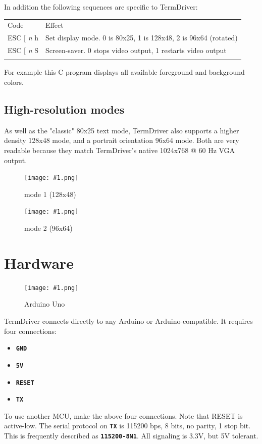 \documentclass{article}
\newcommand{\heavyline}{\specialrule{1pt}{1pt}{1pt}}
\newcommand{\png}[2]{
\begin{figure}[H]
\begin{center}
\texttt{[image: \#1.png]}
\caption{#2}
\end{center}
\end{figure}
}
\newcommand{\mach}[1]{\texttt{\textbf{#1}}}
\newcommand{\gap}{\vspace{10pt}}
\begin{document}
In addition the following sequences are specific to TermDriver:

\gap
\noindent
\begin{tabularx}{\linewidth}{lX}
\heavyline
Code & Effect \\ \heavyline

ESC {[} \emph{n} h & 
Set display mode.  0 is 80x25, 1 is 128x48, 2 is 96x64 (rotated)
\\

ESC {[} \emph{n} S & Screen-saver.  0 stops video output, 1 restarts video output
\\ \heavyline
\end{tabularx}
\gap

\noindent
For example this C program displays all available foreground and background colors.


\subsection{High-resolution modes}

As well as the "classic" 80x25 text mode,
TermDriver also supports a higher density 128x48 mode,
and a portrait orientation 96x64 mode.
Both are very readable because
they match TermDriver's native 1024x768 @ 60 Hz VGA output.

\png{img/moby1}{mode 1 (128x48)}
\png{img/moby2}{mode 2 (96x64)}

\newpage
\section{Hardware}

\png{img/arduino}{Arduino Uno}

TermDriver connects directly to any Arduino or Arduino-compatible.
It requires four connections:

\begin{itemize}
\item \mach{GND}
\item \mach{5V}
\item \mach{RESET}
\item \mach{TX}
\end{itemize}

\noindent
To use another MCU, make the above four connections. Note that RESET is active-low.
The serial protocol on \mach{TX} is 115200 bps, 8 bits, no parity, 1 stop bit.
This is frequently described as \mach{115200-8N1}.
All signaling is 3.3V, but 5V tolerant.
\end{document}
